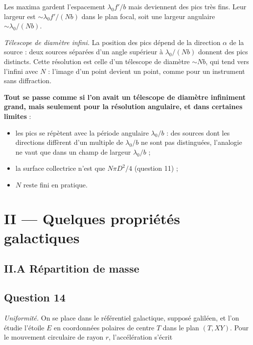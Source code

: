 \documentclass[11pt,a4paper]{article}
\providecommand{\tightlist}{\setlength{\itemsep}{0pt}\setlength{\parskip}{0pt}}
\begin{document}
Les maxima gardent l'espacement \(\lambda_0f'/b\) mais deviennent des pics très fins. Leur largeur est \(\sim\lambda_0f'/(Nb)\) dans le plan focal, soit une largeur angulaire \(\sim\lambda_0/(Nb)\).

\emph{Télescope de diamètre infini.} La position des pics dépend de la direction \(\alpha\) de la source : deux sources séparées d'un angle supérieur à \(\lambda_0/(Nb)\) donnent des pics distincts. Cette résolution est celle d'un télescope de diamètre \(\sim Nb\), qui tend vers l'infini avec \(N\) : l'image d'un point devient un point, comme pour un instrument sans diffraction.

\textbf{Tout se passe comme si l'on avait un télescope de diamètre infiniment grand, mais seulement pour la résolution angulaire, et dans certaines limites} :

\begin{itemize}
\tightlist
\item
  les pics se répètent avec la période angulaire \(\lambda_0/b\) : des sources dont les directions diffèrent d'un multiple de \(\lambda_0/b\) ne sont pas distinguées, l'analogie ne vaut que dans un champ de largeur \(\lambda_0/b\) ;
\item
  la surface collectrice n'est que \(N\pi D^2/4\) (question 11) ;
\item
  \(N\) reste fini en pratique.
\end{itemize}

\hypertarget{ii-quelques-propriuxe9tuxe9s-galactiques}{%
\section{II --- Quelques propriétés galactiques}\label{ii-quelques-propriuxe9tuxe9s-galactiques}}

\hypertarget{ii.a-ruxe9partition-de-masse}{%
\subsection{II.A Répartition de masse}\label{ii.a-ruxe9partition-de-masse}}

\hypertarget{question-14}{%
\subsection{Question 14}\label{question-14}}

\emph{Uniformité.} On se place dans le référentiel galactique, supposé galiléen, et l'on étudie l'étoile \(E\) en coordonnées polaires de centre \(T\) dans le plan \((T,XY)\). Pour le mouvement circulaire de rayon \(r\), l'accélération s'écrit
\end{document}
